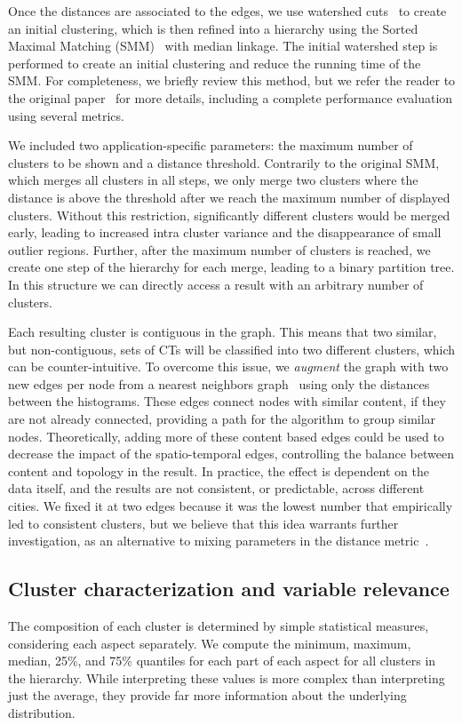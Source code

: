Once the distances are associated to the edges, we use watershed
cuts~\cite{Cousty2009} to create an initial clustering, which is then refined
into a hierarchy using the Sorted Maximal Matching (SMM)~\cite{markus2017} with
median linkage. The initial watershed step is performed to create an initial
clustering and reduce the running time of the SMM. For completeness, we briefly
review this method, but we refer the reader to the original
paper~\cite{markus2017} for more details, including a complete performance
evaluation using several metrics.


We included two application-specific parameters: the maximum number of clusters
to be shown and a distance threshold. Contrarily to the original SMM, which
merges all clusters in all steps, we only merge two clusters where the distance
is above the threshold after we reach the maximum number of displayed clusters.
Without this restriction, significantly different clusters would be merged
early, leading to increased intra cluster variance and the disappearance of
small outlier regions. Further, after the maximum number of clusters is reached,
we create one step of the hierarchy for each merge, leading to a binary
partition tree. In this structure we can directly access a result with an
arbitrary number of clusters.


Each resulting cluster is contiguous in the graph. This means that two similar,
but non-contiguous, sets of CTs will be classified into two different clusters,
which can be counter-intuitive. To overcome this issue, we \emph{augment} the
graph with two new edges per node from a nearest neighbors
graph~\cite{scikit-learn} using only the distances between the histograms. These
edges connect nodes with similar content, if they are not already connected,
providing a path for the algorithm to group similar nodes. Theoretically, adding
more of these content based edges could be used to decrease the impact of the
spatio-temporal edges, controlling the balance between content and topology in
the result. In practice, the effect is dependent on the data itself, and the
results are not consistent, or predictable, across different cities. We fixed it
at two edges because it was the lowest number that empirically led to consistent
clusters, but we believe that this idea warrants further investigation, as an
alternative to mixing parameters in the distance metric~\cite{Chavent2017}.



\subsection{Cluster characterization and variable relevance}
\label{sec:relevance}
The composition of each cluster is determined by simple statistical measures,
considering each aspect separately. We compute the minimum, maximum, median,
25\%, and 75\% quantiles for each part of each aspect for all clusters in the
hierarchy. While interpreting these values is more complex than interpreting
just the average, they provide far more information about the underlying
distribution.


